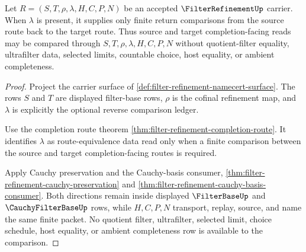 \begin{theorem}
\label{thm:filter-refinement-reverse-ledger-comparison}
Let $R=(S,T,\rho,\lambda,H,C,P,N)$ be an accepted $\FilterRefinementUp$ carrier. When $\lambda$ is present, it supplies only finite return comparisons from the source route back to the target route. Thus source and target completion-facing reads may be compared through $S,T,\rho,\lambda,H,C,P,N$ without quotient-filter equality, ultrafilter data, selected limits, countable choice, host equality, or ambient completeness.
\end{theorem}
\begin{proof}
Project the carrier surface of \autoref{def:filter-refinement-namecert-surface}. The rows $S$ and $T$ are displayed filter-base rows, $\rho$ is the cofinal refinement map, and $\lambda$ is explicitly the optional reverse comparison ledger.

Use the completion route theorem \autoref{thm:filter-refinement-completion-route}. It identifies $\lambda$ as route-equivalence data read only when a finite comparison between the source and target completion-facing routes is required.

Apply Cauchy preservation and the Cauchy-basis consumer, \autoref{thm:filter-refinement-cauchy-preservation} and \autoref{thm:filter-refinement-cauchy-basis-consumer}. Both directions remain inside displayed $\FilterBaseUp$ and $\CauchyFilterBaseUp$ rows, while $H,C,P,N$ transport, replay, source, and name the same finite packet. No quotient filter, ultrafilter, selected limit, choice schedule, host equality, or ambient completeness row is available to the comparison.
\end{proof}

